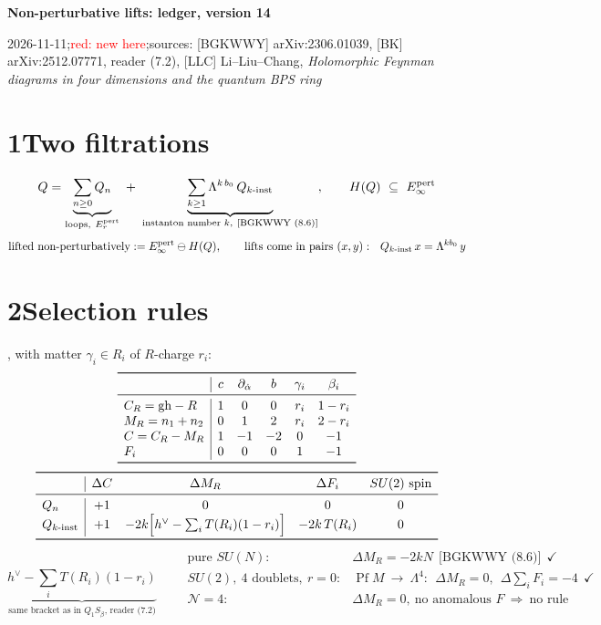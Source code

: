 \documentclass[10pt]{article}
\newcommand{\tagbox}[1]{\fbox{\footnotesize #1}}
\newcommand{\ok}{\checkmark}
\begin{document}
{\Large\bfseries Non-perturbative lifts: ledger, version 14}\par\smallskip
{\small 2026-11-11;\quad \textcolor{red}{red: new here};\quad sources: [BGKWWY] arXiv:2306.01039, [BK] arXiv:2512.07771, reader (7.2), [LLC] Li--Liu--Chang, \emph{Holomorphic Feynman diagrams in four dimensions and the quantum BPS ring}}

\section*{1\quad Two filtrations}
\[
Q=\underbrace{\sum_{n\ge0}Q_n}_{\text{loops},\ E_r^{\rm pert}}\ +\ \underbrace{\sum_{k\ge1}\Lambda^{k\,b_0}\,Q_{k\text{-inst}}}_{\text{instanton number }k,\ \text{[BGKWWY (8.6)]}},
\qquad
H(Q)\ \subseteq\ E_\infty^{\rm pert}
\]
\[
\text{lifted non-perturbatively}:=E_\infty^{\rm pert}\ominus H(Q),\qquad \text{lifts come in pairs }(x,y):\ \ Q_{k\text{-inst}}\,x=\Lambda^{k b_0}\,y
\]

\section*{2\quad Selection rules}
\tagbox{charges}, with matter $\gamma_i\in R_i$ of $R$-charge $r_i$:
\[
\begin{array}{l|ccccc}
\toprule
 & c & \partial_{\dot\alpha} & b & \gamma_i & \beta_i\\\midrule
C_R=\mathrm{gh}-R & 1 & 0 & 0 & r_i & 1-r_i\\
M_R=n_1+n_2 & 0 & 1 & 2 & r_i & 2-r_i\\
C=C_R-M_R & 1 & -1 & -2 & 0 & -1\\
F_i & 0 & 0 & 0 & 1 & -1\\\bottomrule
\end{array}
\]
\tagbox{rules}
\[
\begin{array}{l|cccc}
\toprule
 & \Delta C & \Delta M_R & \Delta F_i & SU(2)\text{ spin}\\\midrule
Q_n & +1 & 0 & 0 & 0\\
Q_{k\text{-inst}} & +1 & -2k\Big[h^\vee-\sum_iT(R_i)(1-r_i)\Big] & -2k\,T(R_i) & 0\\\bottomrule
\end{array}
\]
\[
\underbrace{h^\vee-\sum_iT(R_i)(1-r_i)}_{\text{same bracket as in }Q_1S_{\dot\beta}\text{, reader (7.2)}}
\qquad
\begin{array}{ll}
\text{pure }SU(N):& \Delta M_R=-2kN\ \ \text{[BGKWWY (8.6)]}\ \ \ok\\
SU(2),\ 4\text{ doublets},\ r=0:& \operatorname{Pf}M\ \to\ \Lambda^4:\ \ \Delta M_R=0,\ \ \Delta\textstyle\sum_iF_i=-4\ \ \ok\\
\mathcal N=4:& \Delta M_R=0,\ \text{no anomalous }F\ \Rightarrow\ \text{no rule}
\end{array}
\]
\end{document}
